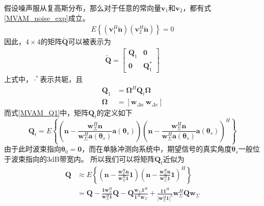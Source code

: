 \documentclass[master]{thesis-uestc}
\begin{document}
假设噪声服从复高斯分布，那么对于任意的常向量$\bm{v}_1$和$\bm{v}_2$，都有式\eqref{MVAM_noise_exp}成立。
\begin{equation}\label{MVAM_noise_exp}
    \begin{aligned}
        E\left\{\left(\bm{v}_1^H\tilde{\bm{n}}\right)\left(\bm{v}_2^H\tilde{\bm{n}}\right)\right\} = 0
    \end{aligned}
\end{equation}
因此，$4\times4$的矩阵$\tilde{\bm{Q}}$可以被表示为
\begin{equation}\label{MVAM_Q_tilde_frac}
    \begin{aligned}
        \tilde{\bm{Q}} = 
        \begin{bmatrix}
            \bm{Q}_1 & \textbf{0} \\
            \textbf{0} & \bm{Q}_1^*
        \end{bmatrix}
    \end{aligned}
\end{equation}
上式中，$\cdot^*$表示共轭，且
\begin{subequations}\label{MVAM_Q1}
    \begin{align}
        \bm{Q}_1 &= \bm{\Omega}^H\bm{Q}_t\bm{\Omega} \\
        \bm{\Omega} &= \left[\bm{w}_{\Delta a}~\bm{w}_{\Delta e}\right]
    \end{align}
\end{subequations}
而式\eqref{MVAM_Q1}中，矩阵$\bm{Q}_t$的定义如下
\begin{equation}
    \bm{Q}_t = E
    \left\{
        \left(\bm{n}-\frac{\bm{w}^H_\Sigma\bm{n}}{\bm{w}^H_\Sigma\bm{a}(\bm{\theta}_s)}\bm{a}(\bm{\theta}_s)\right)
        \left(\bm{n}-\frac{\bm{w}^H_\Sigma\bm{n}}{\bm{w}^H_\Sigma\bm{a}(\bm{\theta}_s)}\bm{a}(\bm{\theta}_s)\right)^H
    \right\}
\end{equation}
由于此时波束指向$\bm{\theta}_0=\textbf{0}$，而在单脉冲测向系统中，期望信号的真实角度$\bm{\theta}_s$一般位于波束指向的3dB带宽内。
所以我们可以将矩阵$\bm{Q}_t$近似为
\begin{equation}
    \begin{aligned}
        \bm{Q} &\approx E
        \left\{
            \left(\bm{n}-\frac{\bm{w}^H_\Sigma\bm{n}}{\bm{w}^H_\Sigma\textbf{1}}\textbf{1}\right)
            \left(\bm{n}-\frac{\bm{w}^H_\Sigma\bm{n}}{\bm{w}^H_\Sigma\textbf{1}}\textbf{1}\right)^H
        \right\} \\
        &=
        \bm{Q} - \frac{\textbf{1}\bm{w}^H_\Sigma}{\bm{w}^H_\Sigma\textbf{1}}\bm{Q} -
        \bm{Q}\frac{\bm{w}_\Sigma\textbf{1}^H}{\textbf{1}^H\bm{w}_\Sigma} + 
        \frac{\textbf{1}\textbf{1}^H}{\left|\bm{w}^H_\Sigma\textbf{1}\right|^2}\bm{w}^H_\Sigma\bm{Q}\bm{w}_\Sigma
    \end{aligned}
\end{equation}
\end{document}
